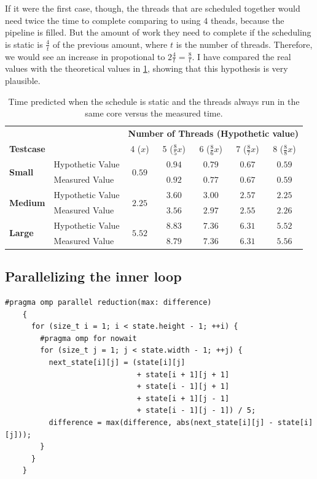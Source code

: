 \documentclass[
    12pt, %
]{fphw}
\begin{document}
    If it were the first case, though,
the threads that are scheduled together would need twice the time to complete
comparing to using $4$ theads, because the pipeline is filled.
But the amount of work they need to complete if the scheduling is static is
$\frac{4}{t}$ of the previous amount, where $t$ is the number of threads.
Therefore, we would see an increase in propotional to $2\frac{4}{t} = \frac{8}{t}$.
I have compared the real values with the theoretical values in \cref{tab:hypothesis-check},
showing that this hypothesis is very plausible.

\begin{table}[h]
    \centering
    \renewcommand{\arraystretch}{1.5}
    \begin{tabular}{p{2cm}l ||ccccc}
        && \multicolumn{5}{c}{\textbf{Number of Threads (Hypothetic value)}} \\
        \textbf{Testcase} && 4 ($x$) & 5 ($\frac{8}{5}x$) & 6 ($\frac{8}{6}x$)
            & 7 ($\frac{8}{7}x$) & 8 ($\frac{8}{8}x$) \\
        \hline\hline
        \multirow{2}{*}{\textbf{Small}}
        & Hypothetic Value & \multirow{2}{*}{$0.59$} & $0.94$
            & $0.79$ & $0.67$ & $0.59$ \\
        & Measured Value & & $0.92$ & $0.77$ & $0.67$ & $0.59$ \\
        \hline
        \multirow{2}{*}{\textbf{Medium}}
        & Hypothetic Value & \multirow{2}{*}{$2.25$} & $3.60$
            & $3.00$ & $2.57$ & $2.25$ \\
        & Measured Value & & $3.56$ & $2.97$ & $2.55$ & $2.26$ \\
        \hline
        \multirow{2}{*}{\textbf{Large}}
        & Hypothetic Value & \multirow{2}{*}{$5.52$} & $8.83$
            & $7.36$ & $6.31$ & $5.52$ \\
        & Measured Value & & $8.79$ & $7.36$ & $6.31$ & $5.56$ \\
    \end{tabular}
    \caption{Time predicted when the schedule is static and
    the threads always run in the same core versus the measured time.}
    \label{tab:hypothesis-check}
\end{table}

\subsection{Parallelizing the inner loop}

\begin{lstlisting}[gobble=4]
    #pragma omp parallel reduction(max: difference)
    {
      for (size_t i = 1; i < state.height - 1; ++i) {
        #pragma omp for nowait
        for (size_t j = 1; j < state.width - 1; ++j) {
          next_state[i][j] = (state[i][j]
                              + state[i + 1][j + 1]  
                              + state[i - 1][j + 1]  
                              + state[i + 1][j - 1]  
                              + state[i - 1][j - 1]) / 5;
          difference = max(difference, abs(next_state[i][j] - state[i][j]));
        }
      }
    }

\end{lstlisting}
\end{document}
